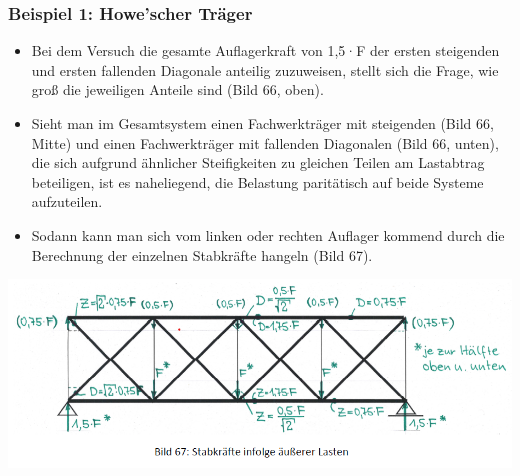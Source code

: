 \documentclass[fleqn,twoside]{article}
\begin{document}
    \subsubsection{Beispiel 1: Howe'scher Träger}
        \begin{minipage}{0.6\textwidth}
            \begin{itemize}
                \item Bei dem Versuch die gesamte Auflagerkraft von 1,5·F der ersten steigenden und ersten fallenden Diagonale anteilig zuzuweisen, stellt sich die Frage, wie groß die jeweiligen Anteile sind (Bild 66, oben).
                \item Sieht man im Gesamtsystem einen Fachwerkträger mit steigenden (Bild 66, Mitte) und einen Fachwerkträger mit fallenden Diagonalen (Bild 66, unten), die sich aufgrund ähnlicher Steifigkeiten zu gleichen Teilen am Lastabtrag beteiligen, ist es naheliegend, die Belastung paritätisch auf beide Systeme aufzuteilen.
                \item Sodann kann man sich vom linken oder rechten Auflager kommend durch die Berechnung der einzelnen Stabkräfte hangeln (Bild 67).
            \end{itemize}
        \includegraphics[width=1\textwidth]{Grafiken/Beurteilen alter Holzkonstruktionen/Kraftfluesse/Howescher Traeger - Ueberlagerte Stabkraefte.png}
        \end{minipage}
\end{document}
